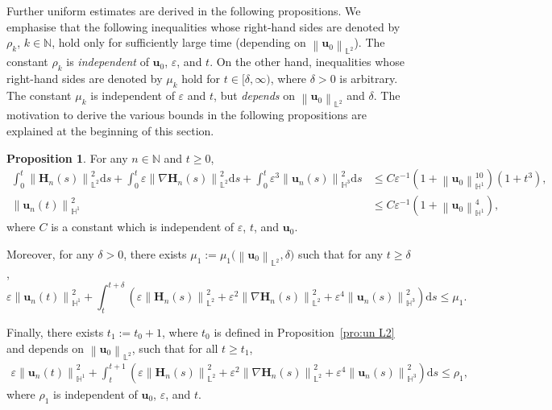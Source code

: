\documentclass[11pt, reqno]{amsart}
\theoremstyle{definition}
\newtheorem{proposition}[theorem]{Proposition}
\numberwithin{equation}{section}
\newcommand{\bff}{\boldsymbol}
\newcommand{\bb}{\mathbb}
\newcommand{\ds}{\mathrm{d}s}
\newcommand{\norm}[2]{\left\|{#1}\right\|_{#2}}
\begin{document}
Further uniform estimates are derived in the following propositions. We emphasise that the following inequalities whose right-hand sides are denoted by $\rho_k$, $k\in \bb{N}$, hold only for sufficiently large time (depending on $\norm{\bff{u}_0}{\bb{L}^2}$). The constant $\rho_k$ is \emph{independent} of $\bff{u}_0$, $\varepsilon$, and $t$. On the other hand, inequalities whose right-hand sides are denoted by $\mu_k$ hold for $t\in [\delta,\infty)$, where $\delta>0$ is arbitrary. The constant $\mu_k$ is independent of $\varepsilon$ and $t$, but \emph{depends} on $\norm{\bff{u}_0}{\bb{L}^2}$ and $\delta$. The motivation to derive the various bounds in the following propositions are explained at the beginning of this section.

\begin{proposition}\label{pro:un H1}
	For any $n\in \bb{N}$ and $t\geq 0$,
	\begin{align}
        \label{equ:int nab Hn L2 t}
		\int_0^t \norm{\bff{H}_n(s)}{\bb{L}^2}^2 \ds
		+
		\int_0^t \varepsilon  \norm{\nabla \bff{H}_n(s)}{\bb{L}^2}^2 \ds
        +
        \int_0^t \varepsilon^3 \norm{\bff{u}_n(s)}{\bb{H}^3}^2 \ds
        &\leq 
        C\varepsilon^{-1}  \left(1+ \norm{\bff{u}_0}{\bb{H}^1}^{10}\right) \left(1+t^3\right),
        \\
        \label{equ:semidisc-est1} 
        \norm{\bff{u}_n(t)}{\bb{H}^1}^2 
        &\leq
        C\varepsilon^{-1} \left(1+\norm{\bff{u}_0}{\bb{H}^1}^4\right),
	\end{align}
	where $C$ is a constant which is independent of $\varepsilon$, $t$, and $\bff{u}_0$.

	Moreover, for any $\delta>0$, there exists $\mu_1:= \mu_1\big(\norm{\bff{u}_0}{\bb{L}^2}, \delta\big)$ such that for any $t\geq \delta$,
	\begin{equation}\label{equ:un H1 int Hn H1}
		\varepsilon \norm{\bff{u}_n(t)}{\bb{H}^1}^2
		+
		\int_t^{t+\delta} \left(\varepsilon \norm{\bff{H}_n(s)}{\bb{L}^2}^2 + \varepsilon^2 \norm{\nabla \bff{H}_n(s)}{\bb{L}^2}^2
		+
		\varepsilon^4 \norm{\bff{u}_n(s)}{\bb{H}^3}^2 \right) \ds
		\leq
		\mu_1.
	\end{equation}
    
	Finally, there exists $t_1:=t_0+1$, where $t_0$ is defined in Proposition~\ref{pro:un L2} and depends on $\norm{\bff{u}_0}{\bb{L}^2}$, such that for all $t\geq t_1$,
	\begin{align}\label{equ:rho 1 sigma 1}
		\varepsilon \norm{\bff{u}_n(t)}{\bb{H}^1}^2 
		+
		\int_t^{t+1} \left(\varepsilon \norm{\bff{H}_n(s)}{\bb{L}^2}^2 + \varepsilon^2 \norm{\nabla \bff{H}_n(s)}{\bb{L}^2}^2
		+
		\varepsilon^4 \norm{\bff{u}_n(s)}{\bb{H}^3}^2 \right) \ds \leq \rho_1,
	\end{align}
	where $\rho_1$ is independent of $\bff{u}_0$, $\varepsilon$, and $t$.
\end{proposition}
\end{document}
